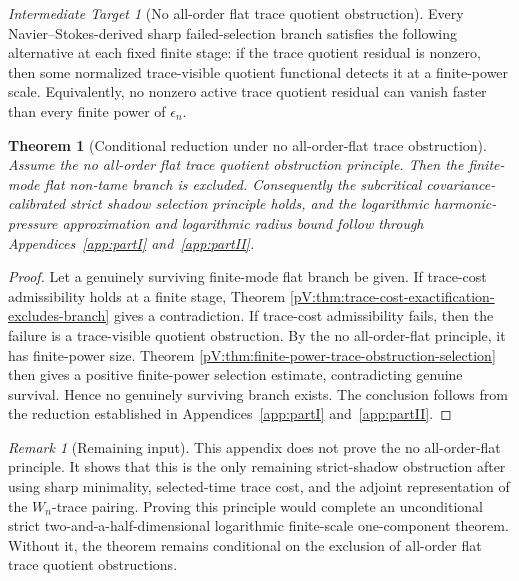 \documentclass[11pt]{article}
\numberwithin{equation}{section}
\theoremstyle{plain}
\newtheorem{theorem}{Theorem}[section]
\theoremstyle{definition}
\theoremstyle{remark}
\newtheorem{target}{Intermediate Target}[section]
\newtheorem{remark}{Remark}[section]
\begin{document}
\begin{target}[No all-order flat trace quotient obstruction]
Every Navier--Stokes-derived sharp failed-selection branch satisfies the following alternative at each fixed finite stage: if the trace quotient residual is nonzero, then some normalized trace-visible quotient functional detects it at a finite-power scale.  Equivalently, no nonzero active trace quotient residual can vanish faster than every finite power of \(\epsilon_n\).
\end{target}

\begin{theorem}[Conditional reduction under no all-order-flat trace obstruction]
Assume the no all-order flat trace quotient obstruction principle.  Then the finite-mode flat non-tame branch is excluded.  Consequently the subcritical covariance-calibrated strict shadow selection principle holds, and the logarithmic harmonic-pressure approximation and logarithmic radius bound follow through Appendices~\ref{app:partI} and~\ref{app:partII}.
\end{theorem}

\begin{proof}
Let a genuinely surviving finite-mode flat branch be given.  If trace-cost admissibility holds at a finite stage, Theorem \ref{pV:thm:trace-cost-exactification-excludes-branch} gives a contradiction.  If trace-cost admissibility fails, then the failure is a trace-visible quotient obstruction.  By the no all-order-flat principle, it has finite-power size.  Theorem \ref{pV:thm:finite-power-trace-obstruction-selection} then gives a positive finite-power selection estimate, contradicting genuine survival.  Hence no genuinely surviving branch exists.  The conclusion follows from the reduction established in Appendices~\ref{app:partI} and~\ref{app:partII}.
\end{proof}

\begin{remark}[Remaining input]
This appendix does not prove the no all-order-flat principle.  It shows that this is the only remaining strict-shadow obstruction after using sharp minimality, selected-time trace cost, and the adjoint representation of the \(W_n\)-trace pairing.  Proving this principle would complete an unconditional strict two-and-a-half-dimensional logarithmic finite-scale one-component theorem.  Without it, the theorem remains conditional on the exclusion of all-order flat trace quotient obstructions.
\end{remark}
\end{document}
